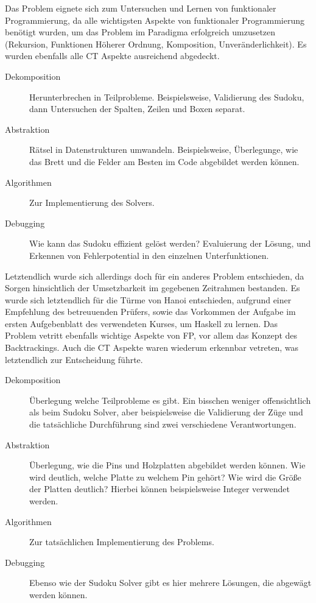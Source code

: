 Das Problem eignete sich zum Untersuchen und Lernen von funktionaler Programmierung, da alle wichtigsten Aspekte von funktionaler Programmierung benötigt wurden, um das Problem im Paradigma erfolgreich umzusetzen (Rekursion, Funktionen Höherer Ordnung, Komposition, Unveränderlichkeit). Es wurden ebenfalls alle CT Aspekte ausreichend abgedeckt.

\begin{description}
    \item[Dekomposition] Herunterbrechen in Teilprobleme. Beispielsweise, Validierung des Sudoku, dann Untersuchen der Spalten, Zeilen und Boxen separat.
    \item[Abstraktion] Rätsel in Datenstrukturen umwandeln. Beispielsweise, Überlegunge, wie das Brett und die Felder am Besten im Code abgebildet werden können.
    \item[Algorithmen] Zur Implementierung des Solvers.
    \item[Debugging] Wie kann das Sudoku effizient gelöst werden? Evaluierung der Lösung, und Erkennen von Fehlerpotential in den einzelnen Unterfunktionen.
\end{description}

Letztendlich wurde sich allerdings doch für ein anderes Problem entschieden, da Sorgen hinsichtlich der Umsetzbarkeit im gegebenen Zeitrahmen bestanden.
Es wurde sich letztendlich für die Türme von Hanoi entschieden, aufgrund einer Empfehlung des betreuuenden Prüfers, sowie das Vorkommen der Aufgabe im ersten Aufgebenblatt des verwendeten Kurses, um Haskell zu lernen. %
Das Problem vetritt ebenfalls wichtige Aspekte von FP, vor allem das Konzept des Backtrackings. Auch die CT Aspekte waren wiederum erkennbar vetreten, was letztendlich zur Entscheidung führte.

\begin{description}
    \item[Dekomposition] Überlegung welche Teilprobleme es gibt. Ein bisschen weniger offensichtlich als beim Sudoku Solver, aber beispielsweise die Validierung der Züge und die tatsächliche Durchführung sind zwei verschiedene Verantwortungen.
    \item[Abstraktion] Überlegung, wie die Pins und Holzplatten abgebildet werden können. Wie wird deutlich, welche Platte zu welchem Pin gehört? Wie wird die Größe der Platten deutlich? Hierbei können beispielsweise Integer verwendet werden.
    \item[Algorithmen] Zur tatsächlichen Implementierung des Problems.
    \item[Debugging] Ebenso wie der Sudoku Solver gibt es hier mehrere Lösungen, die abgewägt werden können.
\end{description}


